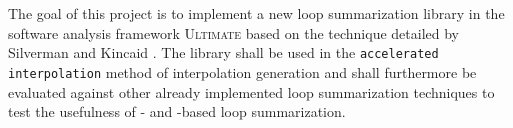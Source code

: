 
The goal of this project is to implement a new loop summarization library in the software analysis framework \textsc{Ultimate}\cite{Zitat02} based on the technique detailed by Silverman and Kincaid \cite{10.1007/978-3-030-25543-5_7}. The library shall be used in the \texttt{accelerated interpolation} method of interpolation generation and shall furthermore be evaluated against other already implemented loop summarization techniques to test the usefulness of \qvasr- and \qvasrs-based loop summarization.